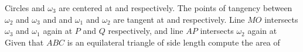 Circles   and $\omega_3$ are centered at   and  respectively.  The points of tangency between $\omega_2$ and  $\omega_3$ and  and $\omega_1$ and $\omega_2$ are tangent at   and  respectively.  Line $MO$ intersects $\omega_3$ and $\omega_1$ again at $P$ and $Q$ respectively, and line $AP$ intersects $\omega_2$ again at   Given that $ABC$ is an equilateral triangle of side length  compute the area of 